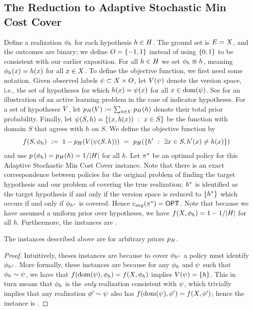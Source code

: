 \subsection{The Reduction to Adaptive Stochastic Min Cost Cover}  
%
Define a realization ${\color{black}{\ensuremath{\phi}}}_h$ for each hypothesis $h \in H$.
The ground set is $E = X$, and the
outcomes are binary; we define $O = \left\{-1,1\right\}$ instead of
using $\left\{0,1\right\}$ to be consistent with our earlier exposition.
For all $h\in H$ we set ${\color{black}{\ensuremath{\phi}}}_h \equiv h$, meaning  
${\color{black}{\ensuremath{\phi}}}_h(x) = h(x)$ for all $x \in X$.
To define the objective function, we first need some notation.
Given observed labels ${\color{black}{\ensuremath{\psi}}} \subset X \times O$, let
$V({\color{black}{\ensuremath{\psi}}})$ denote the version space, i.e., the set of hypotheses for
which $h(x) = {\color{black}{\ensuremath{\psi}}}(x)$ for all $x \in \operatorname{dom}({\color{black}{\ensuremath{\psi}}}) $.
See  for an illustration of an active
learning problem in the case of 
indicator hypotheses.
For a set of hypotheses $V$,  let $p_{H}(V) := \sum_{h \in V}
p_{H}(h)$ denote their total prior probability.
Finally, let ${\color{black}{\ensuremath{\psi}}}(S, h) = \left\{(x, h(x)) \ : \ x \in S \right\}$
be the function with domain $S$ that agrees with $h$ on $S$.
We define the objective function by 
\[
f(S, {\color{black}{\ensuremath{\phi}}}_h) \ :=  \ 1 - p_{H}(V({\color{black}{\ensuremath{\psi}}}(S, h)  ) ) \ = \
p_{H}\! \left( { \left\{h' \ : \ \exists x \in S, h'(x) \neq h(x)\right\}} \right) 
\]
and use ${\color{black}{\ensuremath{p \left( {{\color{black}{\ensuremath{\phi}}}_h} \right) }}} = p_{H}(h) = 1/|H|$ for all $h$.
Let $\pi^*$ be an optimal policy for this 
Adaptive Stochastic Min Cost Cover instance.  Note that there is an exact correspondence between
policies for the original problem of finding the target hypothesis and
our problem of covering the true realization; $h^*$ is identified as the target
hypothesis if and only if the version space is reduced to
$\left\{h^*\right\}$ which occurs if and only if ${\color{black}{\ensuremath{\phi}}}_{h^*}$ is covered.
Hence ${c_{\text{avg}}{(\pi^*)}} = \textsf{OPT}$.
Note that because we have assumed a uniform prior over hypotheses, we have 
$f(X, {\color{black}{\ensuremath{\phi}}}_h) = 1 -  1/|H|$ for all $h$.
Furthermore, the instances are \certifying.

\begin{lemma} \label{lem:active-learning-certifying}
The instances described above are \certifying for arbitrary priors $p_{H}$.   
\end{lemma}

\begin{proof}
Intuitively, theses instances are \certifying because to cover ${\color{black}{\ensuremath{\phi}}}_{h^*}$ a
policy must identify ${\color{black}{\ensuremath{\phi}}}_{h^*}$. More formally, these instances are \certifying because for any 
${\color{black}{\ensuremath{\phi}}}_{h}$ and ${\color{black}{\ensuremath{\psi}}}$ such that ${\color{black}{\ensuremath{\phi}}}_{h} \sim {\color{black}{\ensuremath{\psi}}}$, we have that 
$f(\operatorname{dom}({\color{black}{\ensuremath{\psi}}}), {\color{black}{\ensuremath{\phi}}}_{h}) = f(X, {\color{black}{\ensuremath{\phi}}}_{h})$ implies 
$V({\color{black}{\ensuremath{\psi}}}) = \left\{h\right\}$.   This in turn means that ${\color{black}{\ensuremath{\phi}}}_{h}$ is the \emph{only}
realization consistent with ${\color{black}{\ensuremath{\psi}}}$, which trivially implies that any
realization ${\color{black}{\ensuremath{\phi}}}' \sim {\color{black}{\ensuremath{\psi}}}$ also has $f(\operatorname{dom}({\color{black}{\ensuremath{\psi}}}), {\color{black}{\ensuremath{\phi}}}') =
f(X, {\color{black}{\ensuremath{\phi}}}')$; hence the instance is \certifying.
\end{proof}


